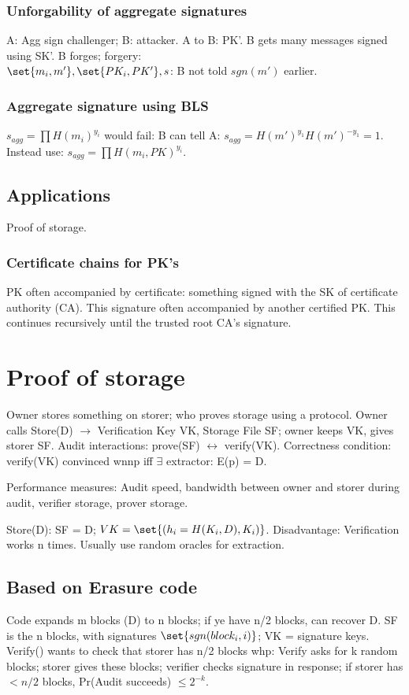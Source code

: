 \documentclass[oneside, article]{memoir}
\begin{document}
\subsubsection{Unforgability of aggregate signatures}
A: Agg sign challenger; B: attacker. A to B: PK'. B gets many messages signed using SK'. B forges; forgery: \\
$\set{m_{i}, m'}, \set{PK_{i}, PK'}, s$: B not told $sgn(m')$ earlier.

\subsubsection{Aggregate signature using BLS}
$s_{agg} = \prod H(m_{i})^{y_{i}}$ would fail: B can tell A: $s_{agg} = H(m')^{y_{1}}H(m')^{-y_{1}} = 1$. Instead use: $s_{agg} = \prod H(m_{i}, PK)^{y_{i}}$.

\subsection{Applications}
Proof of storage.

\subsubsection{Certificate chains for PK's}
PK often accompanied by certificate: something signed with the SK of certificate authority (CA). This signature often accompanied by another certified PK. This continues recursively until the trusted root CA's signature.


\section{Proof of storage}
Owner stores something on storer; who proves storage using a protocol. Owner calls Store(D) $\to$ Verification Key VK, Storage File SF; owner keeps VK, gives storer SF. Audit interactions: prove(SF) $\leftrightarrow$ verify(VK). Correctness condition: verify(VK) convinced wnnp iff $\exists$ extractor: E(p) = D.

Performance measures: Audit speed, bandwidth between owner and storer during audit, verifier storage, prover storage.

Store(D): SF = D; $VK = \set{(h_{i} = H(K_{i}, D), K_{i})}$. Disadvantage: Verification works n times. Usually use random oracles for extraction.

\subsection{Based on Erasure code}
Code expands m blocks (D) to n blocks; if ye have n/2 blocks, can recover D. SF is the n blocks, with signatures $\set{sgn(block_{i}, i)}$; VK = signature keys. Verify() wants to check that storer has n/2 blocks whp: Verify asks for k random blocks; storer gives these blocks; verifier checks signature in response; if storer has $< n/2$ blocks, Pr(Audit succeeds) $\leq 2^{-k}$.
\end{document}
